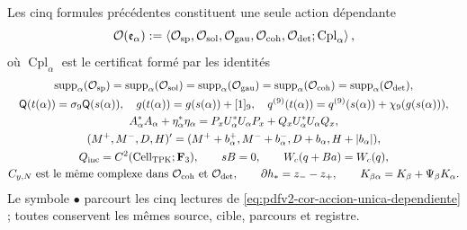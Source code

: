Les cinq formules précédentes constituent une seule action dépendante
\begin{equation}
\label{eq:pdfv2-cor-accion-unica-dependiente}
 \mathcal O(\mathfrak e_\alpha)
 :=\left\langle
 \mathcal O_{\rm sp},\mathcal O_{\rm sol},\mathcal O_{\rm gau},
 \mathcal O_{\rm coh},\mathcal O_{\rm det};
 \operatorname{Cpl}_\alpha
 \right\rangle,
\end{equation}
où \(\operatorname{Cpl}_\alpha\) est le certificat formé par les identités
\begin{equation}
\label{eq:pdfv2-cor-acoplamientos-unicos}
 \begin{gathered}
 \operatorname{supp}_\alpha(\mathcal O_{\rm sp})
 =\operatorname{supp}_\alpha(\mathcal O_{\rm sol})
 =\operatorname{supp}_\alpha(\mathcal O_{\rm gau})
 =\operatorname{supp}_\alpha(\mathcal O_{\rm coh})
 =\operatorname{supp}_\alpha(\mathcal O_{\rm det}),\\
 \mathsf Q(t(\alpha))=\sigma_9\mathsf Q(s(\alpha)),\quad
 g(t(\alpha))=g(s(\alpha))+[1]_9,\quad
 q^{(9)}(t(\alpha))=q^{(9)}(s(\alpha))+\chi_9(g(s(\alpha))),\\
 A_\alpha^*A_\alpha+\eta_\alpha^*\eta_\alpha
 =P_xU_\alpha^*U_\alpha P_x+Q_xU_\alpha^*U_\alpha Q_x,\\
 (M^+,M^-,D,H)'=(M^++b_\alpha^+,M^-+b_\alpha^-,
 D+b_\alpha,H+|b_\alpha|),\\
 Q_{\rm inc}=C^2(\operatorname{Cell}_{\rm TPK};\mathbf F_3),\qquad
 sB=0,\qquad W_c(q+Ba)=W_c(q),\\
 C_{y,N}\text{ est le même complexe dans }
 \mathcal O_{\rm coh}\text{ et }\mathcal O_{\rm det},\qquad
 \partial h_*=z_--z_+,\qquad
 K_{\beta\alpha}=K_\beta+\Psi_\beta K_\alpha.
 \end{gathered}
\end{equation}
Le symbole \(\bullet\) parcourt les cinq lectures de \eqref{eq:pdfv2-cor-accion-unica-dependiente} ; toutes conservent les mêmes source, cible, parcours et registre.

